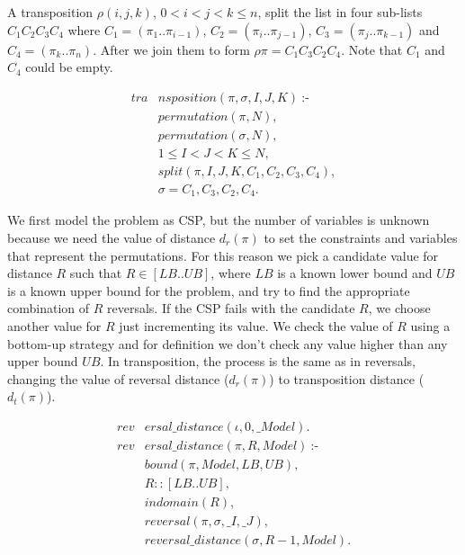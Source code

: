 A transposition $\rho(i,j,k)$, $0 < i < j < k\leq n$, split the list
in four sub-lists $C_{1}C_{2}C_{3}C_{4}$ where $C_{1} = (\pi_{1}
.. \pi_{i-1})$, $C_{2} = (\pi_{i} .. \pi_{j-1})$, $C_{3} = (\pi_{j}
.. \pi_{k-1})$ and $C_{4} = (\pi_{k} .. \pi_{n})$. After we join them
to form $\rho\pi = C_{1}C_{3}C_{2}C_{4}$. Note that $C_{1}$ and
$C_{4}$ could be empty.

\begin{align}
  \label{transposition}
  \textit{tra}&\textit{nsposition}(\pi, \sigma, I, J, K)~\text{:-} \nonumber\\
  &\textit{permutation}(\pi, N), \nonumber\\
  &\textit{permutation}(\sigma, N), \\
  &1 \le I < J < K \le N, \nonumber \\
  &\textit{split}(\pi, I, J, K, C_{1}, C_{2}, C_{3}, C_{4}), \nonumber\\
  &\sigma = C_{1}, C_{3}, C_{2}, C_{4}. \nonumber
\end{align}

We first model the problem as CSP, but the number of variables is
unknown because we need the value of distance $d_{r}(\pi)$ to set the
constraints and variables that represent the permutations. For this
reason we pick a candidate value for distance $R$ such that $R \in [LB
.. UB]$, where $LB$ is a known lower bound and $UB$ is a known upper
bound for the problem, and try to find the appropriate combination of
$R$ reversals. If the CSP fails with the candidate $R$, we choose
another value for $R$ just incrementing its value. We check the value
of $R$ using a bottom-up strategy and for definition we don't check
any value higher than any upper bound $UB$. In transposition, the
process is the same as in reversals, changing the value of reversal
distance ($d_{r}(\pi)$) to transposition distance ($d_{t}(\pi)$).

\begin{align}
  \label{revdistance}
  \textit{rev}&\textit{ersal\_distance}(\iota, 0, \_Model). \nonumber\\
  \textit{rev}&\textit{ersal\_distance}(\pi, R, Model)~\text{:-} \nonumber\\
  &\textit{bound}(\pi, Model, LB, UB), \nonumber\\
  &R :: [LB .. UB], \\
  &\textit{indomain}(R), \nonumber \\
  &\textit{reversal}(\pi, \sigma, \_I, \_J), \nonumber \\
  &\textit{reversal\_distance}(\sigma, R-1, Model). \nonumber
\end{align}

